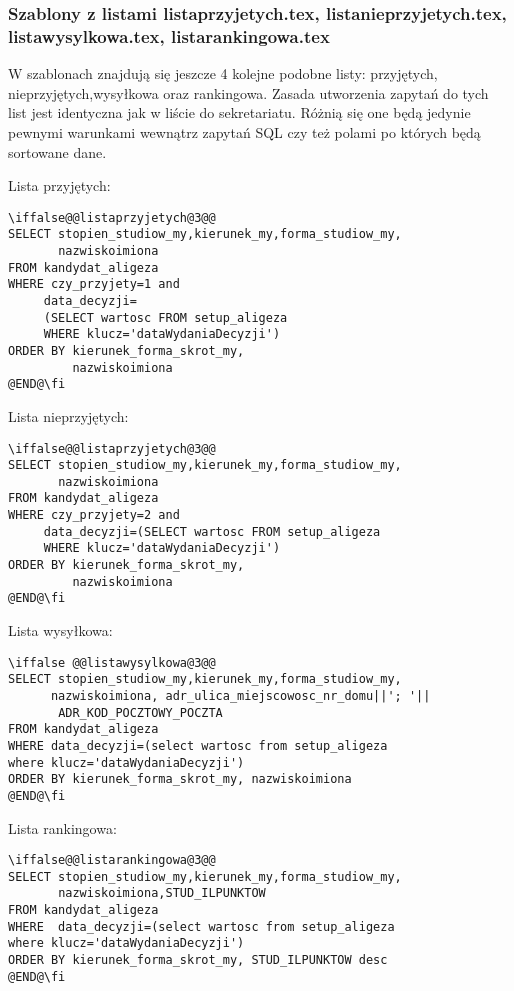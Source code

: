 \subsubsection*{Szablony z listami listaprzyjetych.tex, listanieprzyjetych.tex, listawysylkowa.tex, listarankingowa.tex}
W szablonach znajdują się jeszcze 4 kolejne podobne listy: przyjętych, nieprzyjętych,wysyłkowa oraz rankingowa. Zasada utworzenia zapytań do tych list jest identyczna jak w liście do sekretariatu. Różnią się one będą jedynie pewnymi warunkami wewnątrz zapytań SQL czy też polami po których będą sortowane dane.

\par Lista przyjętych:
 \begin{lstlisting}
\iffalse@@listaprzyjetych@3@@
SELECT stopien_studiow_my,kierunek_my,forma_studiow_my,
       nazwiskoimiona 
FROM kandydat_aligeza 
WHERE czy_przyjety=1 and
     data_decyzji=
     (SELECT wartosc FROM setup_aligeza 
     WHERE klucz='dataWydaniaDecyzji')
ORDER BY kierunek_forma_skrot_my,
         nazwiskoimiona
@END@\fi
\end{lstlisting}
\par Lista nieprzyjętych:
 \begin{lstlisting}
\iffalse@@listaprzyjetych@3@@
SELECT stopien_studiow_my,kierunek_my,forma_studiow_my,
       nazwiskoimiona 
FROM kandydat_aligeza 
WHERE czy_przyjety=2 and
     data_decyzji=(SELECT wartosc FROM setup_aligeza 
     WHERE klucz='dataWydaniaDecyzji')
ORDER BY kierunek_forma_skrot_my,
         nazwiskoimiona
@END@\fi
\end{lstlisting}
\par Lista wysyłkowa:
 \begin{lstlisting}
\iffalse @@listawysylkowa@3@@
SELECT stopien_studiow_my,kierunek_my,forma_studiow_my,
      nazwiskoimiona, adr_ulica_miejscowosc_nr_domu||'; '||
       ADR_KOD_POCZTOWY_POCZTA
FROM kandydat_aligeza 
WHERE data_decyzji=(select wartosc from setup_aligeza 
where klucz='dataWydaniaDecyzji')
ORDER BY kierunek_forma_skrot_my, nazwiskoimiona
@END@\fi
\end{lstlisting}
\par Lista rankingowa:
 \begin{lstlisting}
\iffalse@@listarankingowa@3@@
SELECT stopien_studiow_my,kierunek_my,forma_studiow_my,
       nazwiskoimiona,STUD_ILPUNKTOW
FROM kandydat_aligeza
WHERE  data_decyzji=(select wartosc from setup_aligeza 
where klucz='dataWydaniaDecyzji')
ORDER BY kierunek_forma_skrot_my, STUD_ILPUNKTOW desc
@END@\fi
\end{lstlisting}
\par 

